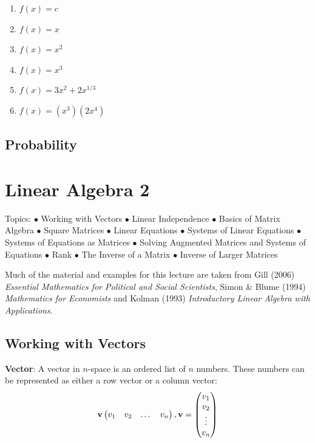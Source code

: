 \documentclass[]{book}
\providecommand{\tightlist}{%
  \setlength{\itemsep}{0pt}\setlength{\parskip}{0pt}}
\theoremstyle{definition}
\theoremstyle{definition}
\theoremstyle{definition}
\theoremstyle{remark}
\begin{document}
\begin{enumerate}
\def\labelenumi{\arabic{enumi}.}
\tightlist
\item
  \(f(x)=c\)
\item
  \(f(x)=x\)
\item
  \(f(x)=x^2\)
\item
  \(f(x)=x^3\)
\item
  \(f(x)=3x^2+2x^{1/3}\)
\item
  \(f(x)=(x^3)(2x^4)\)
\end{enumerate}

\section{Probability}\label{probability}

\chapter{Linear Algebra 2}\label{linear-algebra-2}

Topics: \(\bullet\) Working with Vectors \(\bullet\) Linear Independence
\(\bullet\) Basics of Matrix Algebra \(\bullet\) Square Matrices
\(\bullet\) Linear Equations \(\bullet\) Systems of Linear Equations
\(\bullet\) Systems of Equations as Matrices \(\bullet\) Solving
Augmented Matrices and Systems of Equations \(\bullet\) Rank \(\bullet\)
The Inverse of a Matrix \(\bullet\) Inverse of Larger Matrices

Much of the material and examples for this lecture are taken from Gill
(2006) \emph{Essential Mathematics for Political and Social Scientists},
Simon \& Blume (1994) \emph{Mathematics for Economists} and Kolman
(1993) \emph{Introductory Linear Algebra with Applications}.

\section{Working with Vectors}\label{working-with-vectors}

\textbf{Vector}: A vector in \(n\)-space is an ordered list of \(n\)
numbers. These numbers can be represented as either a row vector or a
column vector:
\[ {\bf v} \begin{pmatrix} v_1 & v_2 & \dots & v_n\end{pmatrix} , {\bf v} = \begin{pmatrix} v_1 \\ v_2 \\ \vdots \\ v_n \end{pmatrix}\]
\end{document}
